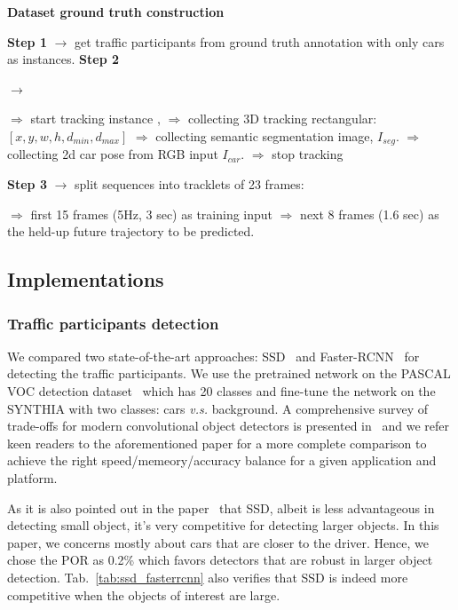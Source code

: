 \documentclass[10pt,twocolumn,letterpaper]{article}
\newlength\myindent
\newcommand\bindent[1][\myindent]{%
  \begingroup
  \setlength{\itemindent}{#1}
  \addtolength{\algorithmicindent}{#1}
}
\newcommand\eindent{\endgroup}
\begin{document}
\begin{algorithm}[h]
\begin{algorithmic}
\caption{\textbf{Dataset ground truth construction}}\label{list:dataset_collection}
\STATE \textbf{Step 1} $\rightarrow $ get traffic participants from ground truth annotation with only cars as instances.
\STATE \textbf{Step 2} {$\rightarrow $ {
\bindent
    \STATE $\Rightarrow$ start tracking instance ,
    \STATE $\Rightarrow$ collecting 3D tracking rectangular: $[x, y, w, h, d_{min}, d_{max}]$
    \STATE $\Rightarrow$ collecting semantic segmentation image, $I_{seg}$.
    \STATE $\Rightarrow$ collecting 2d car pose from RGB input $I_{car}$.
    \STATE $\Rightarrow$ stop tracking
    \ENDIF\eindent}
  }
\STATE \textbf{Step 3} $\rightarrow $ split sequences into tracklets of 23 frames:
{\bindent
    \STATE $\Rightarrow$  first 15 frames (5Hz, 3 sec) as training input
    \STATE $\Rightarrow$  next 8 frames (1.6 sec) as the held-up future trajectory to be predicted.
\eindent}
\end{algorithmic}
\end{algorithm}

\subsection{Implementations}\label{sec:Implementations}


\subsubsection{Traffic participants detection}

We compared two state-of-the-art approaches: SSD~\cite{liu2016ssd} and Faster-RCNN~\cite{ren2015faster} for detecting the traffic participants.
We use the pretrained network on the PASCAL VOC detection dataset~\cite{everingham2015pascal} which has 20 classes and fine-tune the network on the SYNTHIA with two classes: cars \emph{v.s.} background.
A comprehensive survey of trade-offs for modern convolutional object detectors is presented in~\cite{huang2017speed} and we refer keen readers to the aforementioned paper for a more complete comparison to achieve the right speed/memeory/accuracy balance for a given application and platform.

As it is also pointed out in the paper~\cite{huang2017speed} that SSD, albeit is less advantageous in detecting small object, it's very competitive for detecting larger objects. In this paper, we concerns mostly about cars that are closer to the driver. Hence, we chose the POR as 0.2\% which favors detectors that are robust in larger object detection.
Tab.~\ref{tab:ssd_fasterrcnn} also verifies that SSD is indeed more competitive when the objects of interest are large.
\end{document}

